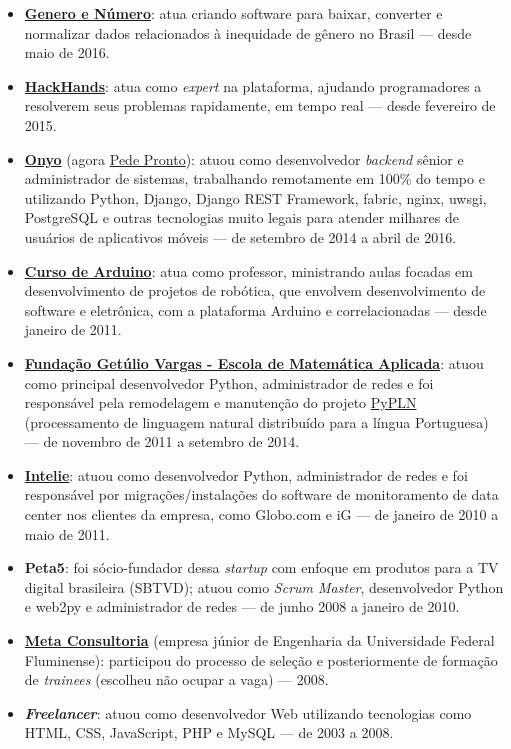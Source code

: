 \documentclass[a4paper,11pt]{article}
\begin{document}
	\begin{itemize}
		\item \href{http://generonumero.media}{\textbf{Genero e Número}}: atua
			criando software para baixar, converter e normalizar dados
			relacionados à inequidade de gênero no Brasil --- desde maio de
			2016.
		\item \href{http://hackhands.com}{\textbf{HackHands}}: atua como
			\textit{expert} na plataforma, ajudando programadores a resolverem
			seus problemas rapidamente, em tempo real --- desde fevereiro de
			2015.
		\item \href{http://onyo.com}{\textbf{Onyo}} (agora
			\href{https://pedepronto.com.br/}{Pede Pronto}): atuou como
			desenvolvedor \textit{backend} sênior e administrador de sistemas,
			trabalhando remotamente em 100\% do tempo e utilizando Python,
			Django, Django REST Framework, fabric, nginx, uwsgi, PostgreSQL e
			outras tecnologias muito legais para atender milhares de usuários
			de aplicativos móveis --- de setembro de 2014 a abril de 2016.
		\item \href{http://www.cursodearduino.com.br/}{\textbf{Curso de
			Arduino}}: atua como professor, ministrando aulas focadas em
			desenvolvimento de projetos de robótica, que envolvem
			desenvolvimento de software e eletrônica, com a plataforma Arduino
			e correlacionadas --- desde janeiro de 2011.
		\item \href{http://emap.fgv.br/}{\textbf{Fundação Getúlio Vargas -
			Escola de Matemática Aplicada}}: atuou como principal desenvolvedor
			Python, administrador de redes e foi responsável pela remodelagem e
			manutenção do projeto \href{http://pypln.org/}{PyPLN}
			(processamento de linguagem natural distribuído para a língua
			Portuguesa) --- de novembro de 2011 a setembro de 2014.
		\item \href{http://www.intelie.com.br/}{\textbf{Intelie}}: atuou como
			desenvolvedor Python, administrador de redes e foi responsável por
			migrações/instalações do software de monitoramento de data center
			nos clientes da empresa, como Globo.com e iG --- de janeiro de 2010
			a maio de 2011.
		\item \textbf{Peta5}: foi sócio-fundador dessa \textit{startup} com
			enfoque em produtos para a TV digital brasileira (SBTVD); atuou
			como \textit{Scrum Master}, desenvolvedor Python e web2py e
			administrador de redes --- de junho 2008 a janeiro de 2010.
		\item \href{http://www.metaconsultoria.com/}{\textbf{Meta Consultoria}}
			(empresa júnior de Engenharia da Universidade Federal Fluminense):
			participou do processo de seleção e posteriormente de formação de
			\textit{trainees} (escolheu não ocupar a vaga) --- 2008.
		\item \textbf{\textit{Freelancer}}: atuou como desenvolvedor Web
			utilizando tecnologias como HTML, CSS, JavaScript, PHP e MySQL ---
			de 2003 a 2008.
	\end{itemize}
\end{document}
